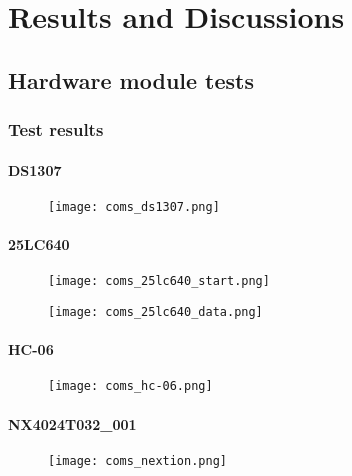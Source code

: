 \chapter{Results and Discussions}



\section{Hardware module tests}
\subsection{Test results}
\subsubsection{DS1307}
\begin{figure}[h!]
	\centering
	\texttt{[image: coms\_ds1307.png]}
	\caption{}
	\label{coms_ds1307}
\end{figure}
\subsubsection{25LC640}
\begin{figure}[h!]
	\centering
	\begin{minipage}[b]{\textwidth}
		\centering
		\texttt{[image: coms\_25lc640\_start.png]}
		\label{fig:coms_25lc640_start}
	\end{minipage}
	\begin{minipage}[b]{\textwidth}
		\centering
		\texttt{[image: coms\_25lc640\_data.png]}
		\label{fig:coms_25lc640_data}
	\end{minipage}	
	\caption{}
	\label{25lc640}
\end{figure}
\subsubsection{HC-06}
\begin{figure}[h!]
	\centering
	\texttt{[image: coms\_hc-06.png]}
	\caption{}
	\label{coms_hc-06}
\end{figure}
\subsubsection{NX4024T032\_001}
\begin{figure}[h!]
	\centering
	\texttt{[image: coms\_nextion.png]}
	\caption{}
	\label{coms_nextion}
\end{figure}
